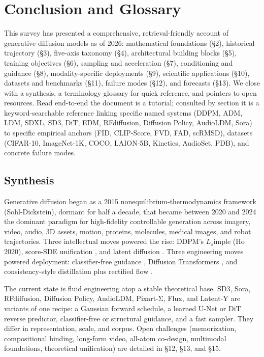 \documentclass{article}
\begin{document}
\section{Conclusion and Glossary}\label{conclusion-and-glossary}

This survey has presented a comprehensive, retrieval-friendly account of generative diffusion models as of 2026: mathematical foundations (§2), historical trajectory (§3), five-axis taxonomy (§4), architectural building blocks (§5), training objectives (§6), sampling and acceleration (§7), conditioning and guidance (§8), modality-specific deployments (§9), scientific applications (§10), datasets and benchmarks (§11), failure modes (§12), and forecasts (§13). We close with a synthesis, a terminology glossary for quick reference, and pointers to open resources. Read end-to-end the document is a tutorial; consulted by section it is a keyword-searchable reference linking specific named systems (DDPM, ADM, LDM, SDXL, SD3, DiT, EDM, RFdiffusion, Diffusion Policy, AudioLDM, Sora) to specific empirical anchors (FID, CLIP-Score, FVD, FAD, scRMSD), datasets (CIFAR-10, ImageNet-1K, COCO, LAION-5B, Kinetics, AudioSet, PDB), and concrete failure modes.

\subsection{Synthesis}\label{synthesis}

Generative diffusion began as a 2015 nonequilibrium-thermodynamics framework (Sohl-Dickstein), dormant for half a decade, that became between 2020 and 2024 the dominant paradigm for high-fidelity controllable generation across imagery, video, audio, 3D assets, motion, proteins, molecules, medical images, and robot trajectories. Three intellectual moves powered the rise: DDPM's \(L_s\)imple (Ho 2020), score-SDE unification \citep{song2021scorebasedgenerati}, and latent diffusion \citep{rombach2022highresolutionimag}. Three engineering moves powered deployment: classifier-free guidance \citep{ho2022classifierfreediff}, Diffusion Transformers \citep{peebles2023scalablediffusionm}, and consistency-style distillation plus rectified flow \citep{song2023consistencymodels}.

The current state is fluid engineering atop a stable theoretical base. SD3, Sora, RFdiffusion, Diffusion Policy, AudioLDM, Pixart-Σ, Flux, and Latent-Y are variants of one recipe: a Gaussian forward schedule, a learned U-Net or DiT reverse predictor, classifier-free or structural guidance, and a fast sampler. They differ in representation, scale, and corpus. Open challenges (memorization, compositional binding, long-form video, all-atom co-design, multimodal foundations, theoretical unification) are detailed in §12, §13, and §15.
\end{document}
